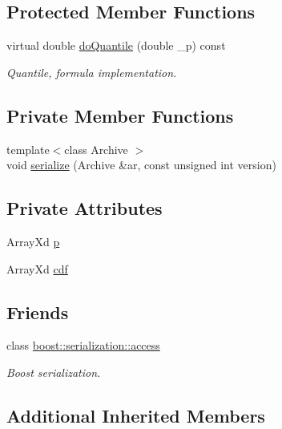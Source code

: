 \subsection*{Protected Member Functions}
\begin{DoxyCompactItemize}
\item 
virtual double \hyperlink{class_c_empirical_d_r_v_afa06f54ed41c6c9e743ea2d7603b6b36}{do\-Quantile} (double \-\_\-p) const 
\begin{DoxyCompactList}\small\item\em Quantile, formula implementation. \end{DoxyCompactList}\end{DoxyCompactItemize}
\subsection*{Private Member Functions}
\begin{DoxyCompactItemize}
\item 
{\footnotesize template$<$class Archive $>$ }\\void \hyperlink{class_c_empirical_d_r_v_ae17e04b165f0f575cb7ee96078faac70}{serialize} (Archive \&ar, const unsigned int version)
\end{DoxyCompactItemize}
\subsection*{Private Attributes}
\begin{DoxyCompactItemize}
\item 
Array\-Xd \hyperlink{class_c_empirical_d_r_v_a854fc8afdf4194880c978b91baff4852}{p}
\item 
Array\-Xd \hyperlink{class_c_empirical_d_r_v_aceab7d27df5fefbaaa64ab7b2e410763}{cdf}
\end{DoxyCompactItemize}
\subsection*{Friends}
\begin{DoxyCompactItemize}
\item 
class \hyperlink{class_c_empirical_d_r_v_ac98d07dd8f7b70e16ccb9a01abf56b9c}{boost\-::serialization\-::access}
\begin{DoxyCompactList}\small\item\em Boost serialization. \end{DoxyCompactList}\end{DoxyCompactItemize}
\subsection*{Additional Inherited Members}



